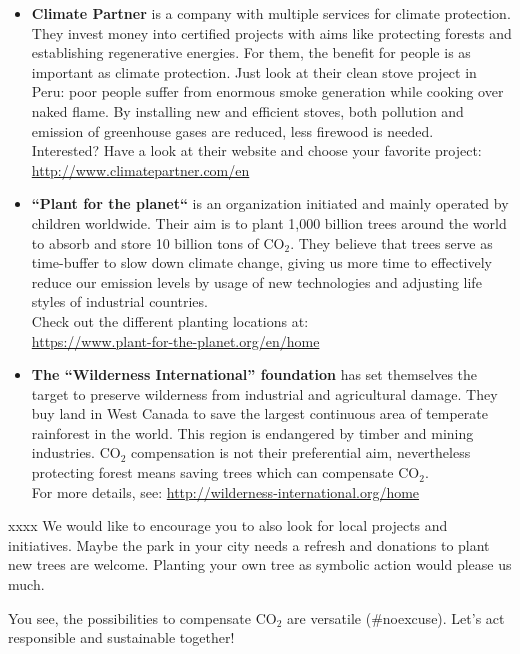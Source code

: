 \begin{itemize}
	\item 
	\textbf{Climate Partner} is a company with multiple services for climate protection.  They invest money into certified projects with aims like protecting forests and establishing regenerative energies. For them, the benefit for people is as important as climate protection. Just look at their clean stove project in Peru: poor people suffer from enormous smoke generation while cooking over naked flame. By installing new and efficient stoves, both pollution and emission of greenhouse gases are reduced, less firewood is needed. \\
	Interested? Have a look at their website and choose your favorite project: \\ \url{http://www.climatepartner.com/en}

	\item 
	\textbf{“Plant for the planet“} is an organization initiated and mainly operated by children worldwide. Their aim is to plant 1,000 billion trees around the world to absorb and store 10 billion tons of CO$_2$. They believe that trees serve as time-buffer to slow down climate change, giving us more time to effectively reduce our emission levels by usage of new technologies and adjusting life styles of industrial countries. \\
	Check out the different planting locations at: \\
	\url{https://www.plant-for-the-planet.org/en/home}

	\item 
	\textbf{The “Wilderness International” foundation} has set themselves the target to preserve wilderness from industrial and agricultural damage. They buy land in West Canada to save the largest continuous area of temperate rainforest in the world. This region is endangered by timber and mining industries. CO$_2$ compensation is not their preferential aim, nevertheless protecting forest means saving trees which can compensate CO$_2$. \\
	For more details, see: \url{http://wilderness-international.org/home} 
\end{itemize}



\begin{suggest}{xxxx} %
	We would like to encourage you to also look for local projects and initiatives. Maybe the park in your city needs a refresh and donations to plant new trees are welcome. Planting your own tree as symbolic action would please us much.	
\end{suggest}


You see, the possibilities to compensate CO$_2$ are versatile (\#noexcuse). Let's act responsible and sustainable together!


